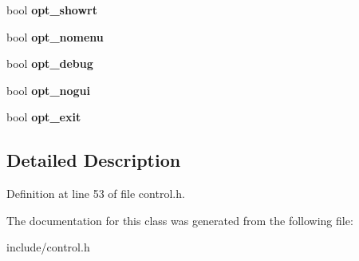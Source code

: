 \begin{DoxyCompactItemize}
\item 
\hypertarget{classConfig_a0b78abf9471b6a2d04d228be7e6792f2}{bool {\bfseries opt\-\_\-showrt}}\label{classConfig_a0b78abf9471b6a2d04d228be7e6792f2}

\item 
\hypertarget{classConfig_ace74f2fb3b918cc45b2486a59281cafc}{bool {\bfseries opt\-\_\-nomenu}}\label{classConfig_ace74f2fb3b918cc45b2486a59281cafc}

\item 
\hypertarget{classConfig_a7d68ad804907496b417a951ed1eada22}{bool {\bfseries opt\-\_\-debug}}\label{classConfig_a7d68ad804907496b417a951ed1eada22}

\item 
\hypertarget{classConfig_ae904e5c4af1cac4af77feb7af250ad29}{bool {\bfseries opt\-\_\-nogui}}\label{classConfig_ae904e5c4af1cac4af77feb7af250ad29}

\item 
\hypertarget{classConfig_a9f68df279656da4abd730ffa83fbb38a}{bool {\bfseries opt\-\_\-exit}}\label{classConfig_a9f68df279656da4abd730ffa83fbb38a}

\end{DoxyCompactItemize}


\subsection{Detailed Description}


Definition at line 53 of file control.\-h.



The documentation for this class was generated from the following file\-:\begin{DoxyCompactItemize}
\item 
include/control.\-h\end{DoxyCompactItemize}
